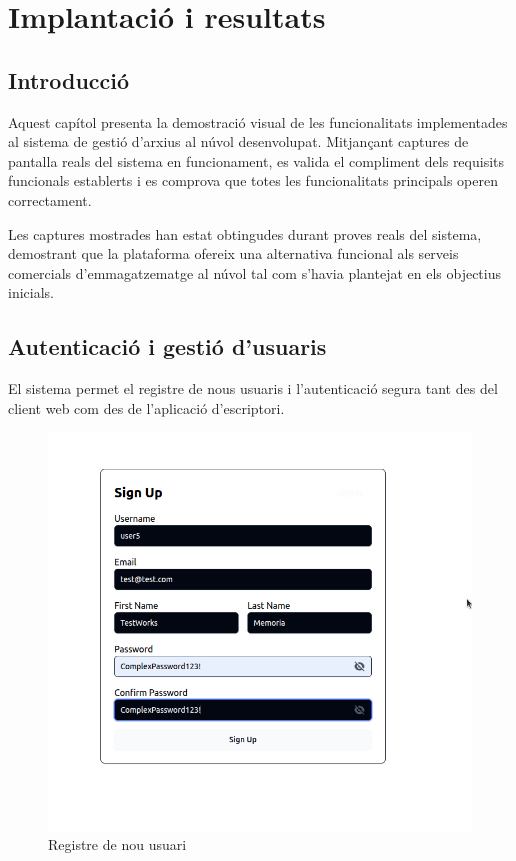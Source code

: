 

\chapter{Implantació i resultats}

\section{Introducció}

Aquest capítol presenta la demostració visual de les funcionalitats implementades al sistema de gestió d'arxius al núvol desenvolupat. Mitjançant captures de pantalla reals del sistema en funcionament, es valida el compliment dels requisits funcionals establerts i es comprova que totes les funcionalitats principals operen correctament.

Les captures mostrades han estat obtingudes durant proves reals del sistema, demostrant que la plataforma ofereix una alternativa funcional als serveis comercials d'emmagatzematge al núvol tal com s'havia plantejat en els objectius inicials.

\section{Autenticació i gestió d'usuaris}

El sistema permet el registre de nous usuaris i l'autenticació segura tant des del client web com des de l'aplicació d'escriptori.

\begin{figure}[H]
\centering
\includegraphics[width=0.7\linewidth]{Figures/implementacio/signup.png}
\caption{Registre de nou usuari}
\label{fig:signup}
\end{figure}


